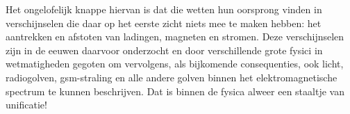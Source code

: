 \documentclass{ximera}
\begin{document}
	Het ongelofelijk knappe hiervan is dat die wetten hun oorsprong vinden in verschijnselen die daar op het eerste zicht niets mee te maken hebben: het aantrekken en afstoten van ladingen, magneten en stromen. Deze verschijnselen zijn in de eeuwen daarvoor onderzocht en door verschillende grote fysici in wetmatigheden gegoten om vervolgens, als bijkomende consequenties, ook licht, radiogolven, gsm-straling en alle andere golven binnen het elektromagnetische spectrum te kunnen beschrijven. Dat is binnen de fysica alweer een staaltje van unificatie!
	
	
\end{document}
